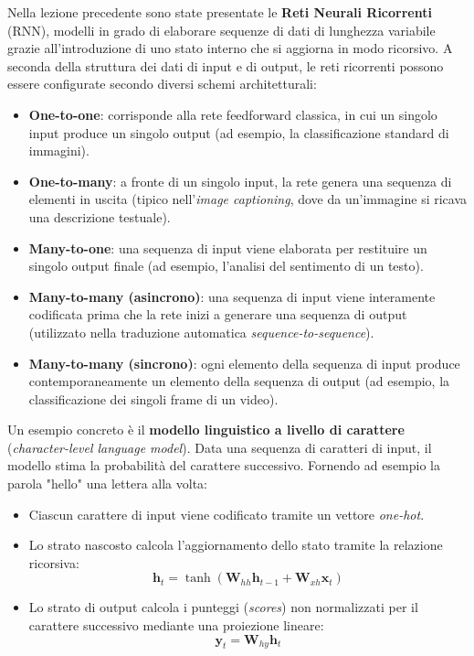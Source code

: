 ﻿\documentclass[11pt, a4paper]{article}
\begin{document}
Nella lezione precedente sono state presentate le \textbf{Reti Neurali Ricorrenti} (RNN), modelli in grado di elaborare sequenze di dati di lunghezza variabile grazie all'introduzione di uno stato interno che si aggiorna in modo ricorsivo. A seconda della struttura dei dati di input e di output, le reti ricorrenti possono essere configurate secondo diversi schemi architetturali:


\begin{itemize}
    \item \textbf{One-to-one}: corrisponde alla rete feedforward classica, in cui un singolo input produce un singolo output (ad esempio, la classificazione standard di immagini).
    \item \textbf{One-to-many}: a fronte di un singolo input, la rete genera una sequenza di elementi in uscita (tipico nell'\emph{image captioning}, dove da un'immagine si ricava una descrizione testuale).
    \item \textbf{Many-to-one}: una sequenza di input viene elaborata per restituire un singolo output finale (ad esempio, l'analisi del sentimento di un testo).
    \item \textbf{Many-to-many (asincrono)}: una sequenza di input viene interamente codificata prima che la rete inizi a generare una sequenza di output (utilizzato nella traduzione automatica \emph{sequence-to-sequence}).
    \item \textbf{Many-to-many (sincrono)}: ogni elemento della sequenza di input produce contemporaneamente un elemento della sequenza di output (ad esempio, la classificazione dei singoli frame di un video).
\end{itemize}

Un esempio concreto è il \textbf{modello linguistico a livello di carattere} (\emph{character-level language model}). Data una sequenza di caratteri di input, il modello stima la probabilità del carattere successivo. Fornendo ad esempio la parola "hello" una lettera alla volta:
\begin{itemize}
    \item Ciascun carattere di input viene codificato tramite un vettore \emph{one-hot}.
    \item Lo strato nascosto calcola l'aggiornamento dello stato tramite la relazione ricorsiva:
    \[
    \bm{h}_t = \tanh(\bm{W}_{hh} \bm{h}_{t-1} + \bm{W}_{xh} \bm{x}_t)
    \]
    \item Lo strato di output calcola i punteggi (\emph{scores}) non normalizzati per il carattere successivo mediante una proiezione lineare:
    \[
    \bm{y}_t = \bm{W}_{hy} \bm{h}_t
    \]
\end{itemize}
\end{document}
